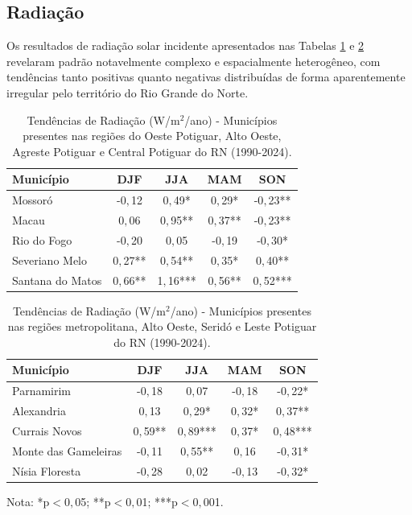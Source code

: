 \subsection{Radiação}

Os resultados de radiação solar incidente apresentados nas Tabelas \ref{tab:tendencias_rad_rn_a} e \ref{tab:tendencias_rad_rn_b} revelaram padrão notavelmente complexo e espacialmente heterogêneo, com tendências tanto positivas quanto negativas distribuídas de forma aparentemente irregular pelo território do Rio Grande do Norte.

\begin{table}[H]
	\centering
	\caption[Tendências de Radiação (W/m$^2$/ano) - RN]{Tendências de Radiação (W/m$^2$/ano) - Municípios presentes nas regiões do Oeste Potiguar, Alto Oeste, Agreste Potiguar e Central Potiguar do RN (1990-2024).}
	\label{tab:tendencias_rad_rn_a}
	\small
	\begin{tabular}{lcccc}
		\hline
		\textbf{Município} & \textbf{DJF} & \textbf{JJA} & \textbf{MAM} & \textbf{SON} \\
		\hline
		Mossoró  & -0${,}$12& 0${,}$49*& 0${,}$29*& -0${,}$23**\\
		Macau& 0${,}$06& 0${,}$95**& 0${,}$37**& -0${,}$23**\\
		Rio do Fogo & -0${,}$20& 0${,}$05& -0${,}$19& -0${,}$30*\\
		Severiano Melo & 0${,}$27**& 0${,}$54**& 0${,}$35*& 0${,}$40**\\
		Santana do Matos & 0${,}$66**& 1${,}$16***& 0${,}$56**& 0${,}$52***\\
		\hline
	\end{tabular}
\end{table}

\begin{table}[H]
	\centering
	\caption{Tendências de Radiação (W/m$^2$/ano) - Municípios presentes nas regiões metropolitana, Alto Oeste, Seridó e Leste Potiguar do RN (1990-2024).}
	\label{tab:tendencias_rad_rn_b}
	\small
	\begin{tabular}{lcccc}
		\hline
		\textbf{Município} & \textbf{DJF} & \textbf{JJA} & \textbf{MAM} & \textbf{SON} \\
		\hline
		Parnamirim & -0${,}$18& 0${,}$07& -0${,}$18& -0${,}$22*\\
		Alexandria & 0${,}$13& 0${,}$29*& 0${,}$32*& 0${,}$37**\\
		Currais Novos & 0${,}$59**& 0${,}$89***& 0${,}$37*& 0${,}$48***\\
		Monte das Gameleiras & -0${,}$11& 0${,}$55**& 0${,}$16& -0${,}$31*\\
		Nísia Floresta & -0${,}$28& 0${,}$02& -0${,}$13& -0${,}$32*\\
		\hline
	\end{tabular}
	\vspace{2mm}
	
	{\footnotesize Nota: *p$<$0${,}$05; **p$<$0${,}$01; ***p$<$0${,}$001.}
\end{table}

